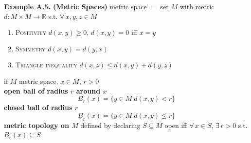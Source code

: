 \documentclass[11pt]{amsart}
\theoremstyle{definition}
\begin{document}
\textbf{Example A.5. (Metric Spaces)}
metric space $=$ set $M$ with metric $d: M \times M \to \mathbb{R}$ s.t. $\forall \, x, y, z \in M$
\begin{enumerate}
\item[(i)] \textsc{Positivity} $d(x,y) \geq 0$, $d(x,y) =0$ iff $x=y$
\item[(ii)] \textsc{Symmetry} $d(x,y) =d(y,x)$
\item[(iii)] \textsc{Triangle inequality} $d(x,z) \leq d(x,y) + d(y,z)$
\end{enumerate}

if $M$ metric space, $x\in M$, $r>0$ \\
\phantom{\quad } \textbf{open ball of radius $r$ around $x$ }
\[
B_r(x) = \{ y \in M | d(x,y) < r \}
\]
\phantom{\quad \quad } \textbf{closed ball of radius $r$ }
\[
\underline{B}_r(x) = \{ y \in M | d(x,y) \leq r \}
\]
\textbf{metric topology on $M$ } defined by declaring $S \subseteq M$ open iff $\forall \, x \in S$, $\exists \, r >0$ s.t. $B_r(x) \subseteq S$


\end{document}
